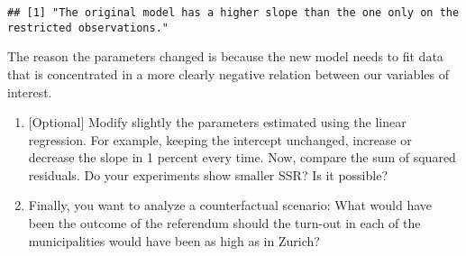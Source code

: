 \documentclass[
]{book}
\begin{document}
\begin{verbatim}
## [1] "The original model has a higher slope than the one only on the restricted observations."
\end{verbatim}

The reason the parameters changed is because the new model needs to fit data that is concentrated in a more clearly negative relation between our variables of interest.

\begin{enumerate}
\def\labelenumi{\roman{enumi}.}
\setcounter{enumi}{5}
\item
  {[}Optional{]} Modify slightly the parameters estimated using the linear regression. For example, keeping the intercept unchanged, increase or decrease the slope in 1 percent every time. Now, compare the sum of squared residuals. Do your experiments show smaller SSR? Is it possible?
\item
  Finally, you want to analyze a counterfactual scenario: What would have been the outcome of the referendum should the turn-out in each of the municipalities would have been as high as in Zurich?
\end{enumerate}
\end{document}
